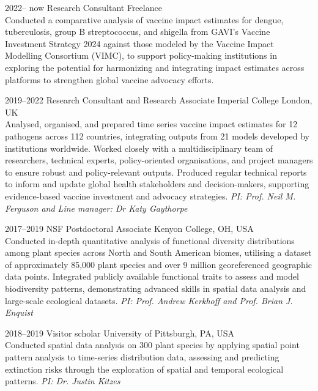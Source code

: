 \documentclass[icon]{twentysecondcv}
\begin{document}
\begin{twenty} %


 \twentyitem
    	{2022-- now}
    	{Research Consultant}
	{Freelance}
        	{\\ \small  Conducted a comparative analysis of vaccine impact estimates for dengue, tuberculosis, group B streptococcus, and shigella from GAVI’s Vaccine Investment Strategy 2024 against those modeled by the Vaccine Impact Modelling Consortium (VIMC), to support policy-making institutions in exploring the potential for harmonizing and integrating impact estimates across platforms to strengthen global vaccine advocacy efforts. }
        	
	
 \twentyitem
       {2019--2022}
       {Research Consultant and Research Associate}
       {Imperial College London, UK}
       { \\ \small Analysed, organised, and prepared time series vaccine impact estimates for 12 pathogens across 112 countries, integrating outputs from 21 models developed by institutions worldwide. Worked closely with a multidisciplinary team of researchers, technical experts, policy-oriented organisations, and project managers to ensure robust and policy-relevant outputs. Produced regular technical reports to inform and update global health stakeholders and decision-makers, supporting evidence-based vaccine investment and advocacy strategies. \textit{ PI: Prof. Neil M. Ferguson and Line manager: Dr Katy Gaythorpe}}
      
\twentyitem
    	{2017--2019}
	{NSF Postdoctoral Associate}
        {Kenyon College, OH, USA}
        {\\  \small Conducted in-depth quantitative analysis of functional diversity distributions among plant species across North and South American biomes, utilising a dataset of approximately 85,000 plant species and over 9 million georeferenced geographic data points. Integrated publicly available functional traits to assess and model biodiversity patterns, demonstrating advanced skills in spatial data analysis and large-scale ecological datasets. \textit{PI: Prof. Andrew Kerkhoff and Prof. Brian J. Enquist} }

\twentyitem
    	{2018--2019}
	{Visitor scholar}
        	{University of Pittsburgh, PA, USA}
        	{\\ \small Conducted spatial data analysis on 300 plant species by applying spatial point pattern analysis to time-series distribution data, assessing and predicting extinction risks through the exploration of spatial and temporal ecological patterns. \textit{PI: Dr. Justin Kitzes}}      
    

\end{twenty}
\end{document}
